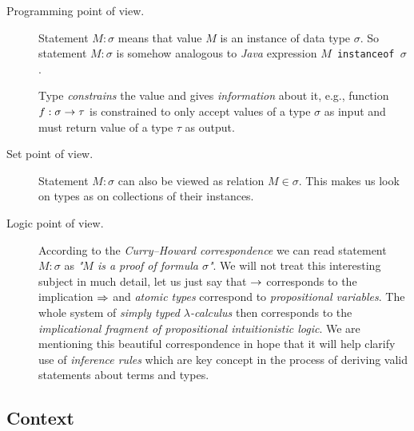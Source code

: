 \documentclass[12pt,a4paper]{report}
\newcommand{\lets}{let us\xspace}
\begin{document}
\begin{description}
  \item[Programming point of view.] 
   Statement $M : \sigma$ means that value $M$ is 
   an instance of data type
   $\sigma$. So statement $M : \sigma$ is
   somehow analogous to \textit{Java}
   expression \texttt{$M$ instanceof $\sigma$}.    
   
   Type \textit{constrains} the value 
   and gives \textit{information} about it, 
   e.g., function $f : \sigma \rightarrow \tau$ 
   is constrained to only accept values of a type $\sigma$
   as input and must return value of a type $\tau$ as output.
     
  \item[Set point of view.] 
     Statement $M : \sigma$ can also be viewed as relation
     $M \in \sigma$. This makes us look on types as on
     collections of their instances.
      
  \item[Logic point of view.] According to 
  the \textit{Curry–Howard correspondence}
  we can read statement $M : \sigma$ as 
  \textit{"$M$ is a proof of formula $\sigma$"}.
  We will not treat this interesting subject in much detail,
  \lets just say that $\rightarrow$ corresponds to the
  implication $\Rightarrow$ and \textit{atomic types} correspond to
  \textit{propositional variables}. The whole system of
  \textit{simply typed $\lambda$-calculus} then corresponds
  to the \textit{implicational fragment of propositional 
  intuitionistic logic}. We are mentioning this beautiful
  correspondence in hope that it will help clarify 
  use of \textit{inference rules} which are key concept
  in the process of deriving valid statements about
  terms and types.  
    
  
\end{description}  	
	


	
\subsection{Context}

\end{document}
